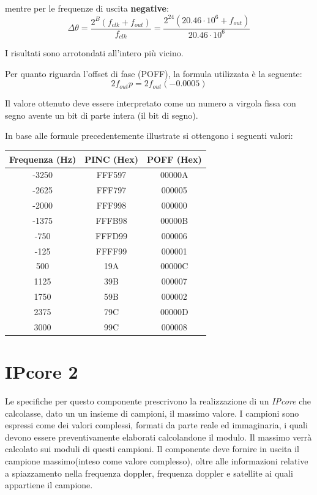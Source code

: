 \documentclass[12pt,a4paper,twoside,openany]{book}
\begin{document}
mentre per le frequenze di uscita \textbf{negative}:
$$
	\Delta \theta = \frac{2^B (f_{clk} + f_{out})}{f_{clk}} = \frac{2^{24} (20.46 \cdot 10^6 + f_{out})}{20.46 \cdot 10^6}
$$

I risultati sono arrotondati all'intero più vicino.

Per quanto riguarda l'offset di fase (POFF), la formula utilizzata è la seguente:
$$
	2 f_{out} p = 2 f_{out} (-0.0005)
$$

Il valore ottenuto deve essere interpretato come un numero a virgola fissa con segno avente un bit di parte intera (il bit di segno).

In base alle formule precedentemente illustrate si ottengono i seguenti valori:\\

\begin{center}
\begin{tabular}{|c|c|c|}
\hline
\textbf{Frequenza} (Hz) & \textbf{PINC} (Hex) & \textbf{POFF} (Hex)\\ 
\hline
-3250								& FFF597					   & 00000A						\\
\hline
-2625								& FFF797					   & 000005						\\
\hline
-2000								& FFF998					   & 000000						\\
\hline
-1375								& FFFB98					   & 00000B						\\
\hline
-750  								& FFFD99					   & 000006						\\
\hline
-125									& FFFF99					   & 000001						\\
\hline
500									& 19A						   & 00000C						\\
\hline
1125								& 39B						   & 000007						\\
\hline
1750								& 59B						   & 000002						\\
\hline
2375								& 79C						   & 00000D						\\
\hline
3000								& 99C						   & 000008						\\
\hline
\end{tabular}
\end{center}
\clearpage

\chapter{IPcore 2}
Le specifiche per questo componente prescrivono la realizzazione di un \textit{IPcore} che calcolasse, dato un un insieme di campioni, il massimo valore. I campioni sono espressi come dei valori complessi, formati da parte reale ed immaginaria, i quali devono essere preventivamente elaborati calcolandone il modulo. Il massimo verrà calcolato sui moduli di questi campioni. Il componente deve fornire in uscita il campione massimo(inteso come valore complesso), oltre alle informazioni relative a spiazzamento nella frequenza doppler, frequenza doppler e satellite ai quali appartiene il campione.
\end{document}
